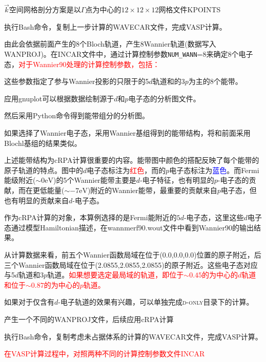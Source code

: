 $\vec k$空间网格剖分方案是以$\Gamma$点为中心的$12\times12\times12$网格文件\textrm{KPOINTS}

执行\textrm{Bash}命令，复制上一步计算的\textrm{WAVECAR}文件，完成\textrm{VASP}计算。

由此会依据前面产生的8个\textrm{Bloch}轨道，产生8\textrm{Wannier}轨道(数据写入\textrm{WANPROJ})。在\textrm{INCAR}文件中，通过计算控制参数\texttt{NUM\_WANN}=8来确定8个电子态，\textcolor{red}{对于\textrm{Wannier90}处理的计算控制参数，包括：}

这些参数指定了参与\textrm{Wannier}投影的只限于的5$d$轨道和的3$p$为主的8个能带。

应用\textrm{gnuplot}可以根据数据绘制源于$d$和$p$电子态的分析图文件。

然后采用\textrm{Python}命令得到能带组分的分析图。

如果选择了\textrm{Wannier}电子态，采用\textrm{Wannier}基组得到的能带结构，将和前面采用\textrm{Blochl}基组的结果类似。

上述能带结构为\textrm{cRPA}计算很重要的内容。能带图中颜色的搭配反映了每个能带的原子轨道的特点。图中的$d$电子态标注为\textcolor{red}{红色}，而的$p$电子态标注为\textcolor{blue}{蓝色}。而\textrm{Fermi}能级附近($\sim0\mathrm{eV}$)的5个\textrm{Wannier}能带主要是$d$-电子特征，也有明显的$p$-电子态的贡献，而在更低能量($\sim-7\mathrm{eV}$)附近的\textrm{Wannier}能带，最重要的贡献来自$p$电子态，但也有明显的贡献来自$d$-电子态。

作为\textrm{cRPA}计算的对象，本算例选择的是\textrm{Fermi}能附近的$5d$-电子态，这里这些$d$电子态通过模型\textrm{Hamiltonian}描述，在\textrm{wannmerf90.wout}文件中看到\textrm{Wannier90}的输出结果。

从计算数据来看，前五个\textrm{Wannier}函数局域在位于\textsc{(0.0,0.0,0.0)}位置的原子附近，后三个\textrm{Wannier}函数局域在位于\textsc{(2.0855,2.0855,2.0855)}的原子附近。这些电子态对应与5$d$轨道和3$p$轨道。\textcolor{red}{如果想要选定最局域的轨道，即位于$\sim0.45$的为中心的$d$轨道和位于$\sim0.87$的为中心的$p$轨道。}%

如果对于仅含有$d$-电子轨道的效果有兴趣，可以单独完成\textsc{d-only}目录下的计算。

产生一个不同的\textrm{WANPROJ}文件，后续应用\textrm{cRPA}计算

执行\textrm{Bash}命令，复制考虑未占据体系的计算的\textrm{WAVECAR}文件，完成\textrm{VASP}计算。

\textcolor{red}{在\textrm{VASP}计算过程中，对照两种不同的计算控制参数文件\textrm{INCAR}}


